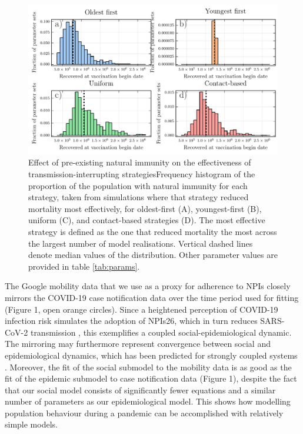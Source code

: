 \begin{figure}
  \includegraphics[width=\textwidth]{chapter_3/histograms.pdf}  
\caption{Effect of pre-existing natural immunity on the effectiveness of transmission-interrupting strategiesFrequency histogram of the proportion of the population with natural immunity for each strategy, taken from simulations where that strategy reduced mortality most effectively, for oldest-first (A), youngest-first (B), uniform (C), and contact-based strategies (D). The most effective strategy is defined as the one that reduced mortality the most across the largest number of model realisations. Vertical dashed lines denote median values of the distribution. Other parameter values are provided in table \ref{tab:params}.}
\label{fig6}
\end{figure}
The Google mobility data that we use as a proxy for adherence to NPIs closely mirrors the COVID-19 case notification data over the time period used for fitting (Figure 1, open orange circles).  Since a heightened perception of COVID-19 infection risk simulates the adoption of NPIs26, which in turn reduces SARS-CoV-2 transmission \cite{anderson2020estimating,peak2020individual}, this exemplifies a coupled  social-epidemiological dynamic.  The mirroring may furthermore represent convergence between social and epidemiological dynamics, which has been predicted for strongly coupled systems \cite{sigdel2019convergence}. Moreover, the fit of the social submodel to the mobility data is as good as the fit of the epidemic submodel to case notification data (Figure 1), despite the fact that our social model consists of significantly fewer equations and a similar number of parameters as our epidemiological model. This shows how modelling population behaviour during a pandemic can be accomplished with relatively simple models. 

